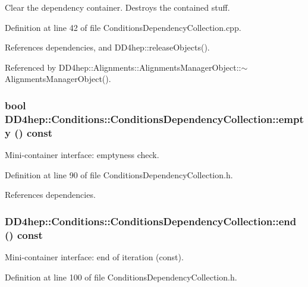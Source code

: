 Clear the dependency container. Destroys the contained stuff. 

Definition at line 42 of file ConditionsDependencyCollection.cpp.

References dependencies, and DD4hep::releaseObjects().

Referenced by DD4hep::Alignments::AlignmentsManagerObject::$\sim$AlignmentsManagerObject().\hypertarget{class_d_d4hep_1_1_conditions_1_1_conditions_dependency_collection_a0570fdbe73d69513617d65f905309ce4}{
\subsubsection[{empty}]{\setlength{\rightskip}{0pt plus 5cm}bool DD4hep::Conditions::ConditionsDependencyCollection::empty () const}}
\label{class_d_d4hep_1_1_conditions_1_1_conditions_dependency_collection_a0570fdbe73d69513617d65f905309ce4}


Mini-\/container interface: emptyness check. 

Definition at line 90 of file ConditionsDependencyCollection.h.

References dependencies.\hypertarget{class_d_d4hep_1_1_conditions_1_1_conditions_dependency_collection_ac383d621dfe19531ec18d9e6139577e9}{
\subsubsection[{end}]{ DD4hep::Conditions::ConditionsDependencyCollection::end () const}}
\label{class_d_d4hep_1_1_conditions_1_1_conditions_dependency_collection_ac383d621dfe19531ec18d9e6139577e9}


Mini-\/container interface: end of iteration (const). 

Definition at line 100 of file ConditionsDependencyCollection.h.

